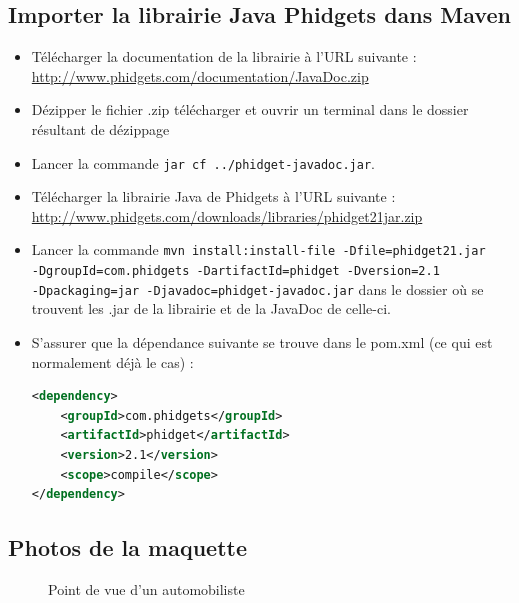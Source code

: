 \subsection{Importer la librairie Java Phidgets dans Maven}
\begin{itemize}
\item Télécharger la documentation de la librairie à l’URL suivante :\\\url{http://www.phidgets.com/documentation/JavaDoc.zip}
\item Dézipper le fichier .zip télécharger et ouvrir un terminal dans le dossier résultant de dézippage
\item Lancer la commande \texttt{jar cf ../phidget-javadoc.jar}.
\item Télécharger la librairie Java de Phidgets à l’URL suivante : \url{http://www.phidgets.com/downloads/libraries/phidget21jar.zip}
\item Lancer la commande \texttt{mvn install:install-file -Dfile=phidget21.jar\\-DgroupId=com.phidgets -DartifactId=phidget -Dversion=2.1\\-Dpackaging=jar -Djavadoc=phidget-javadoc.jar} dans le dossier où se trouvent les .jar de la librairie et de la JavaDoc de celle-ci.
\item S'assurer que la dépendance suivante se trouve dans le pom.xml (ce qui est normalement déjà le cas) :
\begin{lstlisting}[language=XML, numbers=none]
<dependency>
    <groupId>com.phidgets</groupId>
    <artifactId>phidget</artifactId>
    <version>2.1</version>
    <scope>compile</scope>
</dependency>
\end{lstlisting}

\end{itemize}

\subsection{Photos de la maquette}

\begin{figure}[H]
    \begin{center}
        \caption{Point de vue d'un automobiliste}
    \end{center}
\end{figure}

